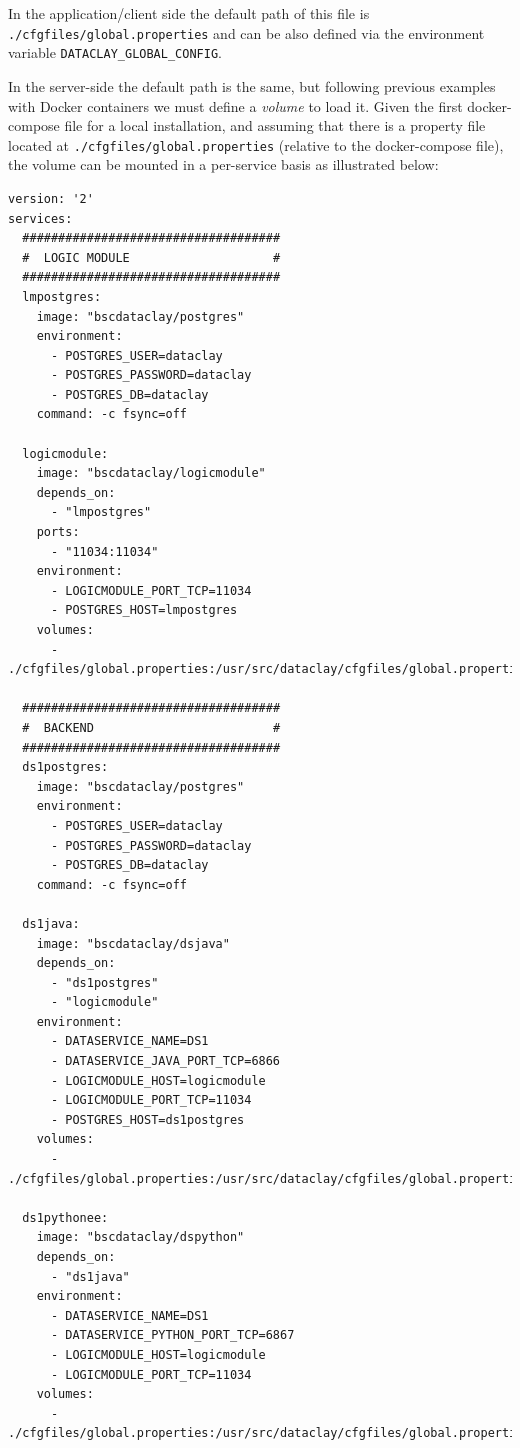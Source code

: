 In the application/client side the default path of this file is \texttt{./cfgfiles/global.properties} and can be also defined via the environment variable \texttt{DATACLAY\_GLOBAL\_CONFIG}.

In the server-side the default path is the same, but following previous examples with Docker containers we must define a \textit{volume} to load it. Given the first docker-compose file for a local installation, and assuming that there is a property file located at \texttt{./cfgfiles/global.properties} (relative to the docker-compose file), the volume can be mounted in a per-service basis as illustrated below:

\begin{tBox}
 \begin{lstlisting}[language=docker-compose-2, frame=none]
version: '2' 
services:
  ####################################
  #  LOGIC MODULE                    #
  ####################################
  lmpostgres:
    image: "bscdataclay/postgres"
    environment:
      - POSTGRES_USER=dataclay
      - POSTGRES_PASSWORD=dataclay
      - POSTGRES_DB=dataclay
    command: -c fsync=off

  logicmodule:
    image: "bscdataclay/logicmodule"
    depends_on:
      - "lmpostgres"
    ports:
      - "11034:11034"
    environment:
      - LOGICMODULE_PORT_TCP=11034
      - POSTGRES_HOST=lmpostgres
    volumes:
      - ./cfgfiles/global.properties:/usr/src/dataclay/cfgfiles/global.properties

  ####################################
  #  BACKEND                         #
  ####################################
  ds1postgres:
    image: "bscdataclay/postgres"
    environment:
      - POSTGRES_USER=dataclay
      - POSTGRES_PASSWORD=dataclay
      - POSTGRES_DB=dataclay
    command: -c fsync=off

  ds1java:
    image: "bscdataclay/dsjava"
    depends_on:
      - "ds1postgres"
      - "logicmodule"
    environment:
      - DATASERVICE_NAME=DS1
      - DATASERVICE_JAVA_PORT_TCP=6866
      - LOGICMODULE_HOST=logicmodule
      - LOGICMODULE_PORT_TCP=11034
      - POSTGRES_HOST=ds1postgres
    volumes:
      - ./cfgfiles/global.properties:/usr/src/dataclay/cfgfiles/global.properties

  ds1pythonee:
    image: "bscdataclay/dspython"
    depends_on:
      - "ds1java"
    environment:
      - DATASERVICE_NAME=DS1
      - DATASERVICE_PYTHON_PORT_TCP=6867
      - LOGICMODULE_HOST=logicmodule
      - LOGICMODULE_PORT_TCP=11034     
    volumes:
      - ./cfgfiles/global.properties:/usr/src/dataclay/cfgfiles/global.properties
 \end{lstlisting}
\end{tBox}

